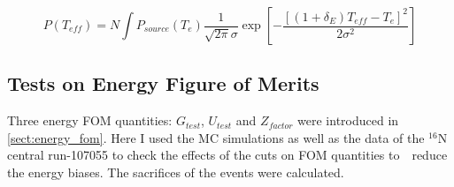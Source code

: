 \begin{equation}
P(T_{eff})=N\int P_{source}(T_e)\frac{1}{\sqrt{2\pi}\sigma}\exp [-\frac{[(1+\delta_E)T_{eff}-T_e]^2}{2\sigma^2}]
\end{equation}

\subsection{Tests on Energy Figure of Merits}\label{sect:energy_fomTest}
Three energy FOM quantities: $G_{test}$, $U_{test}$ and $Z_{factor}$ were introduced in \ref{sect:energy_fom}.
Here I used the MC simulations as well as the data of the $^{16}$N central run-107055 to check the effects of the cuts on FOM quantities to　reduce the energy biases. The sacrifices of the events were calculated. 



